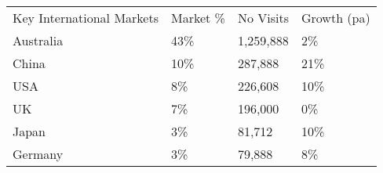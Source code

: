 \begin{tabular}[t]{p{3.5cm}p{1.1cm}p{1.3cm}p{1.2cm}}
 Key International Markets & Market \% & No Visits & Growth (pa) \\ 
 Australia & 43\% & 1,259,888 & 2\% \\ 
  China & 10\% &   287,888 & 21\% \\ 
  USA & 8\% &   226,608 & 10\% \\ 
  UK & 7\% &   196,000 & 0\% \\ 
  Japan & 3\% &    81,712 & 10\% \\ 
  Germany & 3\% &    79,888 & 8\% \\ 
  \end{tabular}
